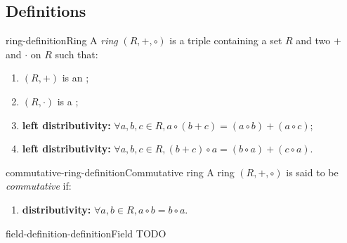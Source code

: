\documentclass[preview]{standalone}
\begin{document}
\genpage

\subsection{Definitions}

\begin{snippetdefinition}{ring-definition}{Ring}
    A \textit{ring} \((R, +, \circ)\) is a triple containing a set \(R\) and two 
    \(+\) and \(\cdot\) on \(R\) such that:
    \begin{enumerate}
        \item \((R, +)\) is an \abeliangroup;
        \item \((R, \cdot)\) is a \monoid;
        \item \textbf{left distributivity:} \(\forall a,b,c\in R, a\circ(b+c) = (a\circ b) + (a \circ c)\);
        \item \textbf{left distributivity:} \(\forall a,b,c\in R, (b+c)\circ a = (b\circ a) + (c \circ a)\).
    \end{enumerate}
\end{snippetdefinition}

\begin{snippetdefinition}{commutative-ring-definition}{Commutative ring}
    A ring \((R, +, \circ)\) is said to be \textit{commutative} if:
    \begin{enumerate}
        \item \textbf{distributivity:} \(\forall a,b\in R, a\circ b = b\circ a\).
    \end{enumerate}
\end{snippetdefinition}

\begin{snippetdefinition}{field-definition-definition}{Field}
    TODO
\end{snippetdefinition}
\end{document}
